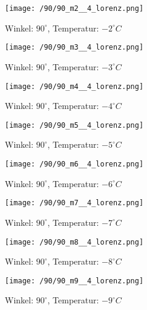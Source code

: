 \clearpage
\begin{figure}[c]
\centering
\texttt{[image: /90/90\_m2\_\_4\_lorenz.png]}
\caption{Winkel: $ 90^\circ$, Temperatur: $ -2^\circ C$}
\end{figure}
\begin{figure}[c]
\centering
\texttt{[image: /90/90\_m3\_\_4\_lorenz.png]}
\caption{Winkel: $ 90^\circ$, Temperatur: $ -3^\circ C$}
\end{figure}
\clearpage
\begin{figure}[c]
\centering
\texttt{[image: /90/90\_m4\_\_4\_lorenz.png]}
\caption{Winkel: $ 90^\circ$, Temperatur: $ -4^\circ C$}
\end{figure}
\begin{figure}[c]
\centering
\texttt{[image: /90/90\_m5\_\_4\_lorenz.png]}
\caption{Winkel: $ 90^\circ$, Temperatur: $ -5^\circ C$}
\end{figure}
\clearpage
\begin{figure}[c]
\centering
\texttt{[image: /90/90\_m6\_\_4\_lorenz.png]}
\caption{Winkel: $ 90^\circ$, Temperatur: $ -6^\circ C$}
\end{figure}
\begin{figure}[c]
\centering
\texttt{[image: /90/90\_m7\_\_4\_lorenz.png]}
\caption{Winkel: $ 90^\circ$, Temperatur: $ -7^\circ C$}
\end{figure}
\clearpage
\begin{figure}[c]
\centering
\texttt{[image: /90/90\_m8\_\_4\_lorenz.png]}
\caption{Winkel: $ 90^\circ$, Temperatur: $ -8^\circ C$}
\end{figure}
\begin{figure}[c]
\centering
\texttt{[image: /90/90\_m9\_\_4\_lorenz.png]}
\caption{Winkel: $ 90^\circ$, Temperatur: $ -9^\circ C$}
\end{figure}
\clearpage
